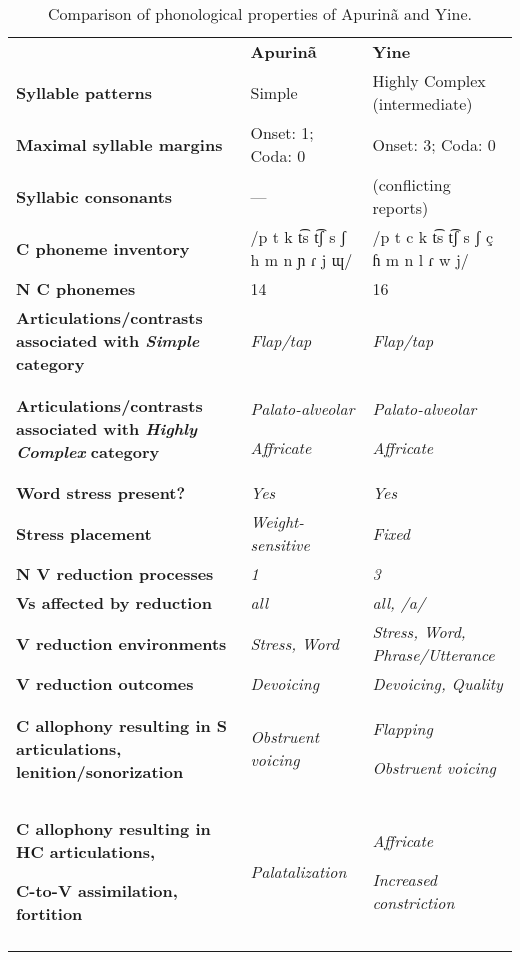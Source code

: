 \begin{table}
\begin{tabularx}{\textwidth}{XXX}
\lsptoprule
 & \textbf{Apurinã} & \textbf{Yine}\\
 \textbf{Syllable patterns} & Simple & Highly Complex (intermediate)\\
 \textbf{Maximal syllable margins} & Onset: 1; Coda: 0 & Onset: 3; Coda: 0\\
 \textbf{Syllabic consonants} & — & (conflicting reports)\\
 \textbf{C phoneme inventory} & /p t k t͡s t͡ʃ s ʃ h m n ɲ ɾ j ɰ/ & /p t c k t͡s t͡ʃ s ʃ ç ɦ m n l ɾ w j/\\
 \textbf{N C phonemes} & 14 & 16\\
 \textbf{Articulations/contrasts associated with \textit{Simple}} \textbf{category} & \textit{Flap/tap} & \textit{Flap/tap}\\
 \textbf{Articulations/contrasts associated with \textit{Highly Complex}} \textbf{category} & { \textit{Palato-alveolar}}

 \textit{Affricate} & { \textit{Palato-alveolar}}

 \textit{Affricate}\\
 \textbf{Word stress present?} & \textit{Yes} & \textit{Yes}\\
 \textbf{Stress placement} & \textit{Weight-sensitive} & \textit{Fixed}\\
 \textbf{N V reduction processes} & \textit{1} & \textit{3}\\
 \textbf{Vs affected by reduction}  & \textit{all} & \textit{all, /a/}\\
 \textbf{V reduction environments} & \textit{Stress, Word} & \textit{Stress, Word, Phrase/Utterance}\\
 \textbf{V reduction outcomes} & \textit{Devoicing} & \textit{Devoicing, Quality}\\
 \textbf{C allophony resulting in S articulations, lenition/sonorization} & \textit{Obstruent voicing} & { \textit{Flapping}}

 \textit{Obstruent voicing}\\
{ \textbf{C allophony resulting in HC articulations,} }

 \textbf{C-to-V assimilation, fortition} & \textit{Palatalization} & { \textit{Affricate}}

 \textit{Increased constriction}\\
\lspbottomrule
\end{tabularx}
\caption{\label{tab:8.3}Comparison of phonological properties of Apurinã and Yine.}
\end{table}

